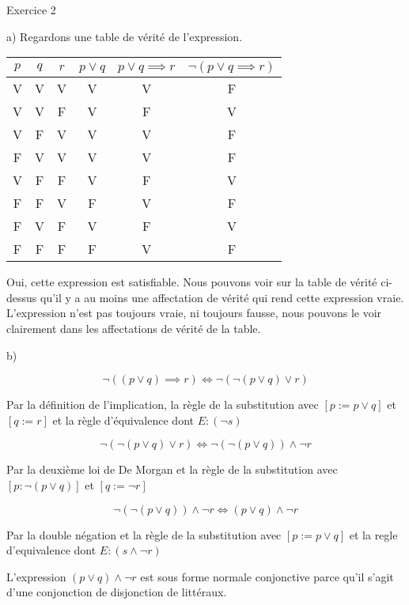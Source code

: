 \documentclass{article}
\begin{document}
Exercice 2

\vspace{0.5cm}

a) Regardons une table de vérité de l'expression.

\begin{center}
\begin{tabular}{| c | c | c | c | c | c |}
\hline
$p$ & $q$ & $r$ & $p \lor q$ & $p \lor q \implies r$ & $ \neg(p \lor q \implies r) $\\
\hline
V & V & V & V & V & F \\
V & V & F & V & F & V \\
V & F & V & V & V & F \\
F & V & V & V & V & F \\
V & F & F & V & F & V \\
F & F & V & F & V & F \\
F & V & F & V & F & V \\
F & F & F & F & V & F \\
\hline
\end{tabular}
\end{center}

Oui, cette expression est satisfiable. Nous pouvons voir sur la table de vérité ci-dessus qu'il y a au moins une affectation de vérité qui rend cette expression vraie. L'expression n'est pas toujours vraie, ni toujours fausse, nous pouvons le voir clairement dans les affectations de vérité de la table.

\vspace{0.5cm}

b) 

$$ \neg((p \lor q) \implies r) \iff \neg(\neg(p \lor q) \lor r)$$

Par la définition de l’implication, la règle de la substitution avec $[p := p \lor q]$ et $[q :=r]$ et la règle d’équivalence dont $E : (\neg s)$

$$ \neg(\neg(p \lor q) \lor r) \iff  \neg(\neg(p \lor q)) \land \neg r $$

Par la deuxième loi de De Morgan et la règle de la substitution avec $[p : \neg(p \lor q)]$ et $[q :=\neg r]$

$$  \neg(\neg(p \lor q)) \land \neg r \iff (p \lor q) \land \neg r$$

Par la double négation et la règle de la substitution avec $[p := p \lor q]$ et la regle d’equivalence dont $E : (s \land \neg r)$

L'expression $(p \lor q) \land \neg r$ est sous forme normale conjonctive parce qu'il s'agit d'une conjonction de disjonction de littéraux.
\end{document}
